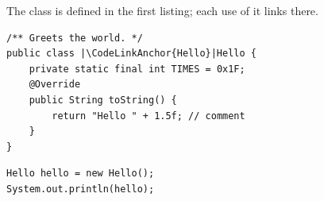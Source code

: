 \documentclass{article}
\begin{document}
\begin{minipage}{8cm}
The class  is defined in the first listing; each use of it links there.

\begin{verbatim}
/** Greets the world. */
public class |\CodeLinkAnchor{Hello}|Hello {
    private static final int TIMES = 0x1F;
    @Override
    public String toString() {
        return "Hello " + 1.5f; // comment
    }
}
\end{verbatim}

\begin{verbatim}
Hello hello = new Hello();
System.out.println(hello);
\end{verbatim}
\end{minipage}
\end{document}
